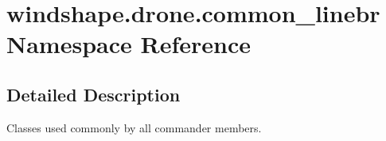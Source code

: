 \hypertarget{namespacewindshape_1_1drone_1_1common__linebr}{}\section{windshape.\+drone.\+common\+\_\+linebr Namespace Reference}
\label{namespacewindshape_1_1drone_1_1common__linebr}


\subsection{Detailed Description}
\begin{DoxyVerb}Classes used commonly by all commander members.
\end{DoxyVerb}
 